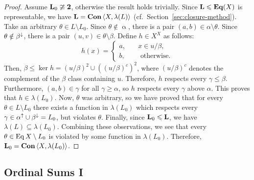\begin{proof}
  Assume $\mathbf{L}_0 \ncong \mathbf{2}$, otherwise the result holds trivially. 
  Since $\mathbf{L}\leqslant \mathbf{Eq}(X)$ is representable, we have $\mathbf{L} = \mathbf{Con\,}
  \langle X, \lambda(L)\rangle$ (cf.~Section~\ref{sec:closure-method}).  Take an arbitrary
  $\theta \in L \setminus L_0$. Since $\theta \notin \upalpha$, 
  there is a pair 
  $(a,b) \in \alpha \setminus \theta$.  Since $\theta \notin \beta^{\downarrow}$, there is
  a pair $(u,v)\in \theta\setminus \beta$. Define $h\in X^X$ as follows:
  \begin{equation}
    \label{eq:h}
    h(x) = \begin{cases}
      a,& \quad x\in u/\beta,\\
      b,& \quad \text{ otherwise.}
    \end{cases}
  \end{equation}
  Then, $\beta \leq \ker h = (u/\beta)^2 \cup ((u/\beta)^c)^2$, where $(u/\beta)^c$ denotes the
  complement of the $\beta$ class containing $u$.  Therefore, $h$ respects every
  $\gamma \leq \beta$.  Furthermore, $(a, b) \in \gamma$ for all $\gamma \geq \alpha$,
  so $h$ respects every $\gamma$ above $\alpha$.  This proves that $h\in \lambda(L_0)$.
  Now, $\theta$ was arbitrary, so we have proved that for every $\theta \in L
  \setminus L_0$ there exists a function in $\lambda(L_0)$ which respects every
  $\gamma \in \alpha^{\uparrow}\cup \beta^{\downarrow} = L_0$, but violates $\theta$.  Finally,
  since 
  $\mathbf{L}_0 \leqslant \mathbf{L}$, we have $\lambda(L)\subseteq \lambda(L_0)$.  Combining these
  observations, we see that every $\theta \in \operatorname{Eq} X \setminus L_0$ is
  violated by some function in $\lambda(L_0)$. Therefore, $\mathbf{L}_0 = \mathbf{Con\,} \langle X, \lambda(L_0)\rangle$.
\end{proof}

\subsection{Ordinal Sums I}
\label{sec:ordinal-sums}

